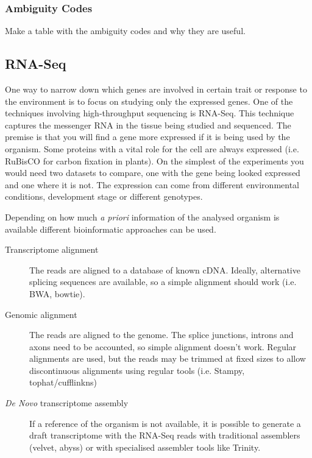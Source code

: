 \subsubsection{Ambiguity Codes}
\label{lit:ambiguity}
Make a table with the ambiguity codes and why they are useful. 




\subsection{RNA-Seq}
\label{lit:RNASeq}

One way to narrow down which genes are involved in certain trait or response to the environment is to focus on studying only the expressed genes. One of the techniques involving high-throughput sequencing is RNA-Seq. This technique captures the messenger RNA in the tissue being studied and sequenced. The premise is that you will find a gene more expressed if it is being used by the organism. Some proteins with a vital role for the cell are always expressed (i.e. RuBisCO for carbon fixation in plants\cite{CooperGM2000}). On the simplest of the experiments you would need two datasets to compare, one with the gene being looked expressed and one where it is not. The expression can come from different environmental conditions, development stage or different genotypes.\cite{Mortazavi2008} 

Depending on how much \textit{a priori} information of the analysed organism is available different bioinformatic approaches can be used.
\begin{description}
\item[Transcriptome alignment] The reads are aligned to a database of known cDNA. Ideally, alternative splicing sequences are available, so a simple alignment should work (i.e. BWA, bowtie). 
\item[Genomic alignment] The reads are aligned to the genome. The splice junctions, introns and axons need to be accounted, so simple alignment doesn't work. Regular alignments are used, but the reads may be trimmed at fixed sizes to allow discontinuous alignments using regular tools (i.e. Stampy, tophat/cufflinkns)
\item[\textit{De Novo} transcriptome assembly] If a reference of the organism is not available, it is possible to generate a draft transcriptome with the RNA-Seq reads with traditional assemblers (velvet, abyss) or with specialised assembler tools like Trinity. 
\end{description}

